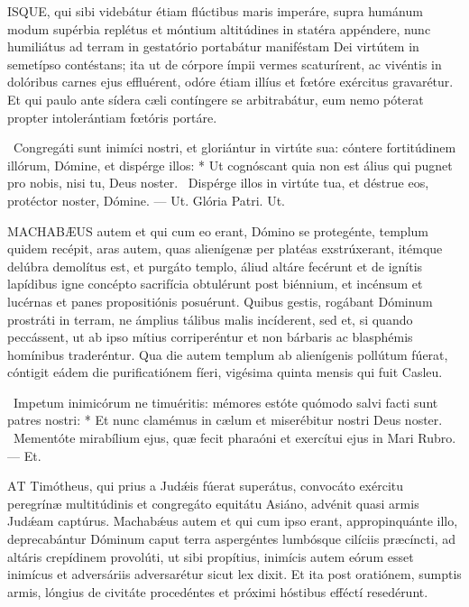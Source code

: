 \lettrine[lines=2]{I}{SQUE}, qui sibi videbátur étiam flúctibus maris imperáre, supra humánum modum supérbia replétus et móntium altitúdines in statéra appéndere, nunc humiliátus ad terram in gestatório portabátur maniféstam Dei virtútem in semetípso contéstans; ita ut de córpore ímpii vermes scaturírent, ac vivéntis in dolóribus carnes ejus effluérent, odóre étiam illíus et fœtóre exércitus gravarétur. Et qui paulo ante sídera cæli contíngere se arbitrabátur, eum nemo póterat propter intolerántiam fœtóris portáre.

\R\ Congregáti sunt inimíci nostri, et gloriántur in virtúte sua: cóntere fortitúdinem illórum, Dómine, et dispérge illos: * Ut cognóscant quia non est álius qui pugnet pro nobis, nisi tu, Deus noster. \V\ Dispérge illos in virtúte tua, et déstrue eos, protéctor noster, Dómine. — Ut. Glória Patri. Ut.




\lettrine[lines=2]{M}{ACHABÆUS} autem et qui cum eo erant, Dómino se protegénte, templum quidem recépit, aras autem, quas alienígenæ per platéas exstrúxerant, itémque delúbra demolítus est, et purgáto templo, áliud altáre fecérunt et de ignítis lapídibus igne concépto sacrifícia obtulérunt post biénnium, et incénsum et lucérnas et panes propositiónis posuérunt. Quibus gestis, rogábant Dóminum prostráti in terram, ne ámplius tálibus malis incíderent, sed et, si quando peccássent, ut ab ipso mítius corriperéntur et non bárbaris ac blasphémis homínibus traderéntur. Qua die autem templum ab alienígenis pollútum fúerat, cóntigit eádem die purificatiónem fíeri, vigésima quinta mensis qui fuit Casleu.

\R\ Impetum inimicórum ne timuéritis: mémores estóte quómodo salvi facti sunt patres nostri: * Et nunc clamémus in cælum et miserébitur nostri Deus noster. \V\ Mementóte mirabílium ejus, quæ fecit pharaóni et exercítui ejus in Mari Rubro. — Et.


\lettrine[lines=2]{A}{T} Timótheus, qui prius a Judǽis fúerat superátus, convocáto exércitu peregrínæ multitúdinis et congregáto equitátu Asiáno, advénit quasi armis Judǽam captúrus. Machabǽus autem et qui cum ipso erant, appropinquánte illo, deprecabántur Dóminum caput terra aspergéntes lumbósque cilíciis præcíncti, ad altáris crepídinem provolúti, ut sibi propítius, inimícis autem eórum esset inimícus et adversáriis adversarétur sicut lex dixit. Et ita post oratiónem, sumptis armis, lóngius de civitáte procedéntes et próximi hóstibus efféctí resedérunt.

